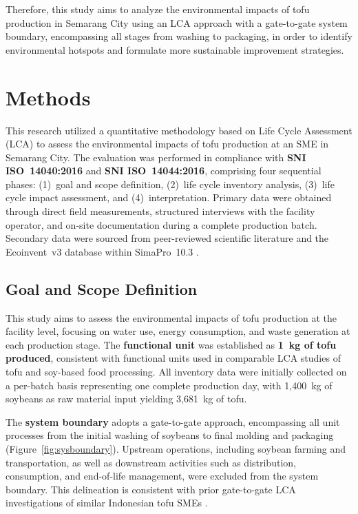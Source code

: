 \documentclass[12pt,a4paper]{article}
\begin{document}
Therefore, this study aims to analyze the environmental impacts of tofu production in Semarang City
using an LCA approach with a gate-to-gate system boundary, encompassing all stages from washing to
packaging, in order to identify environmental hotspots and formulate more sustainable improvement
strategies.



\section{Methods}

This research utilized a quantitative methodology based on Life Cycle Assessment (LCA) to assess the
environmental impacts of tofu production at an SME in Semarang City. The evaluation was performed in
compliance with \textbf{SNI ISO~14040:2016} and \textbf{SNI ISO~14044:2016}, comprising four sequential
phases: (1)~goal and scope definition, (2)~life cycle inventory analysis, (3)~life cycle impact
assessment, and (4)~interpretation. Primary data were obtained through direct field measurements,
structured interviews with the facility operator, and on-site documentation during a complete production
batch. Secondary data were sourced from peer-reviewed scientific literature and the Ecoinvent~v3
database within SimaPro~10.3 \citep{Hauschild2017}.

\subsection{Goal and Scope Definition}

This study aims to assess the environmental impacts of tofu production at the facility level, focusing
on water use, energy consumption, and waste generation at each production stage. The \textbf{functional
unit} was established as \textbf{1~kg of tofu produced}, consistent with functional units used in
comparable LCA studies of tofu and soy-based food processing. All inventory data were initially
collected on a per-batch basis representing one complete production day, with 1{,}400~kg of soybeans as
raw material input yielding 3{,}681~kg of tofu.

The \textbf{system boundary} adopts a gate-to-gate approach, encompassing all unit processes from the
initial washing of soybeans to final molding and packaging (Figure~\ref{fig:sysboundary}). Upstream
operations, including soybean farming and transportation, as well as downstream activities such as
distribution, consumption, and end-of-life management, were excluded from the system boundary. This
delineation is consistent with prior gate-to-gate LCA investigations of similar Indonesian tofu SMEs
\citep{Nugroho2024, Wardana2024}.
\end{document}
